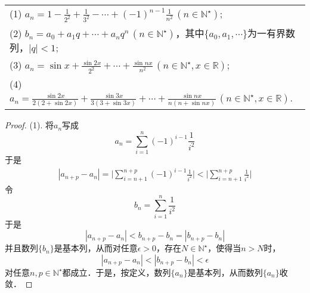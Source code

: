 \begin{table}[H]
    \centering
    \begin{tabularx}{\textwidth} { >{\raggedright\arraybackslash}X }
    (1) $\displaystyle a_n = 1-\frac{1}{2^2}+\frac{1}{3^2}-\cdots+(-1)^{n-1}\frac{1}{n^2}\, (n\in\mathbb{N}^\star)$; \\ [0.7em]
    (2) $\displaystyle b_n = a_0 + a_1 q + \cdots + a_n q^n \, (n \in \mathbb{N}^\star)$，其中$\{a_0,a_1,\cdots\}$为一有界数列，$|q|<1$; \\ [0.7em]
    (3) $a_n = \displaystyle \sin x + \frac{\sin 2x}{2^2} + \cdots + \frac{\sin nx}{n^2}\, (n \in \mathbb{N}^\star, x \in \mathbb{R})$; \\ [0.7em]
    (4) $a_n = \displaystyle \frac{\sin 2x}{2(2+\sin 2x)} + \frac{\sin 3x}{3(3+\sin 3x)} + \cdots + \frac{\sin nx}{n(n+\sin nx)} \, (n\in\mathbb{N}^\star, x \in \mathbb{R})$.
    \end{tabularx}
\end{table}

\begin{proof}
(1). 将$a_n$写成
\begin{equation}
    a_n = \sum_{i=1}^n (-1)^{i-1} \frac{1}{i^2}
\end{equation}
于是
\begin{align}
    |a_{n+p}-a_n| = \Bigg\lvert\sum_{i=n+1}^{n+p} (-1)^{i-1}\frac{1}{i^2} \Bigg\rvert < \Bigg\lvert \sum_{i=n+1}^{n+p} \frac{1}{i^2} \Bigg\rvert
\end{align}
令
\begin{equation}
    b_n = \sum_{i=1}^n \frac{1}{i^2}
\end{equation}
于是
\begin{equation}
    |a_{n+p}-a_n|<b_{n+p} - b_n =|b_{n+p}-b_n|
\end{equation}
并且数列$\{ b_n \}$是基本列，从而对任意$\epsilon > 0$，存在$N \in \mathbb{N}^\star$，使得当$n > N$时，
\begin{equation}
    |a_{n+p}-a_n|<|b_{n+p}-b_n|<\epsilon
\end{equation}
对任意$n,p \in \mathbb{N}^\star$都成立．于是，按定义，数列$\{a_n\}$是基本列，从而数列$\{a_n\}$收敛．
\end{proof}

